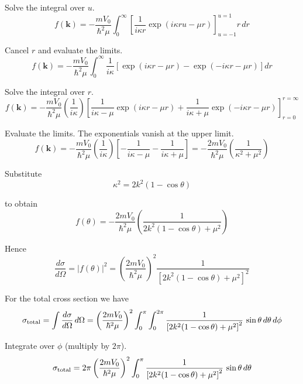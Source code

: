 Solve the integral over $u$.
\begin{equation*}
f(\mathbf k)=-\frac{mV_0}{\hbar^2\mu}
\int_0^\infty
\left[\frac{1}{i\kappa r}\exp(i\kappa ru-\mu r)\right]_{u=-1}^{u=1}
r\,dr
\end{equation*}

Cancel $r$ and evaluate the limits.
\begin{equation*}
f(\mathbf k)=-\frac{mV_0}{\hbar^2\mu}
\int_0^\infty
\frac{1}{i\kappa}
\left[\exp(i\kappa r-\mu r)-\exp(-i\kappa r-\mu r)\right]
dr
\end{equation*}

Solve the integral over $r$.
\begin{equation*}
f(\mathbf k)=-\frac{mV_0}{\hbar^2\mu}
\left(\frac{1}{i\kappa}\right)
\left[
\frac{1}{i\kappa-\mu}
\exp(i\kappa r-\mu r)
+\frac{1}{i\kappa +\mu}
\exp(-i\kappa r-\mu r)
\right]_{r=0}^{r=\infty}
\end{equation*}

Evaluate the limits. The exponentials vanish at the upper limit.
\begin{equation*}
f(\mathbf k)=-\frac{mV_0}{\hbar^2\mu}
\left(\frac{1}{i\kappa}\right)
\left[
-\frac{1}{i\kappa-\mu}
-\frac{1}{i\kappa+\mu}
\right]
=-\frac{2mV_0}{\hbar^2\mu}\left(\frac{1}{\kappa^2+\mu^2}\right)
\tag{1}
\end{equation*}

Substitute
\begin{equation*}
\kappa^2=2k^2(1-\cos\theta)
\end{equation*}

to obtain
\begin{equation*}
f(\theta)=-\frac{2mV_0}{\hbar^2\mu}\left(\frac{1}{2k^2(1-\cos\theta)+\mu^2}\right)
\end{equation*}

Hence
\begin{equation*}
\frac{d\sigma}{d\Omega}
=|f(\theta)|^2=\left(\frac{2mV_0}{\hbar^2\mu}\right)^2
\frac{1}{\left[2k^2(1-\cos\theta)+\mu^2\right]^2}
\end{equation*}

For the total cross section we have
\begin{equation*}
\sigma_{\rm total}=\int\frac{d\sigma}{d\Omega}\,d\Omega
=\left(\frac{2mV_0}{\hbar^2\mu}\right)^2\int_0^\pi\int_0^{2\pi}
\frac{1}{\left[2k^2(1-\cos\theta)+\mu^2\right]^2}\,\sin\theta\,d\theta\,d\phi
\end{equation*}

Integrate over $\phi$ (multiply by $2\pi$).
\begin{equation*}
\sigma_{\rm total}=2\pi\left(\frac{2mV_0}{\hbar^2\mu}\right)^2
\int_0^\pi\frac{1}{\left[2k^2(1-\cos\theta)+\mu^2\right]^2}\,\sin\theta\,d\theta
\end{equation*}

